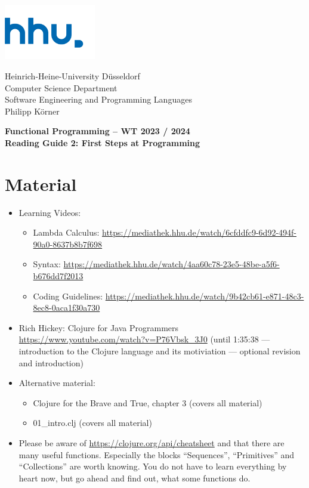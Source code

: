 \documentclass[11pt,a4paper]{article}
\begin{document}
\begin{minipage}[b]{\textwidth}
	\parbox[t]{5cm}{%
		\includegraphics[width=4cm]{unilogo}
		\hfill
	}
	\parbox[b]{11cm}{%
		Heinrich-Heine-University D\"usseldorf\\
		Computer Science Department\\
		Software Engineering and Programming Languages\\
		Philipp K\"orner
	}
\end{minipage}
\begin{center}
	\bf
	Functional Programming -- WT 2023 / 2024\\
	Reading Guide 2: First Steps at Programming
\end{center}

\pagestyle{empty}

\section{Material} 

\begin{itemize}
    \item Learning Videos: 
        \begin{itemize}
            \item Lambda Calculus: \url{https://mediathek.hhu.de/watch/6cfddfc9-6d92-494f-90a0-8637b8b7f698}
            \item Syntax: \url{https://mediathek.hhu.de/watch/4aa60c78-23e5-48be-a5f6-b676dd7f2013}
            \item Coding Guidelines: \url{https://mediathek.hhu.de/watch/9b42cb61-e871-48c3-8ec8-0aca1f30a730}
        \end{itemize}
    \item Rich Hickey: Clojure for Java Programmers \url{https://www.youtube.com/watch?v=P76Vbsk_3J0} (until 1:35:38 --- introduction to the Clojure language and its motiviation --- optional revision and introduction)
    \item Alternative material:
        \begin{itemize}
            \item Clojure for the Brave and True, chapter 3 (covers all material)
            \item 01\_intro.clj (covers all material)
        \end{itemize}
    \item Please be aware of \url{https://clojure.org/api/cheatsheet} and that there are many useful functions.
        Especially the blocks ``Sequences'', ``Primitives'' and ``Collections'' are worth knowing.
        You do not have to learn everything by heart now, but go ahead and find out, what some functions do.
\end{itemize}
\end{document}
